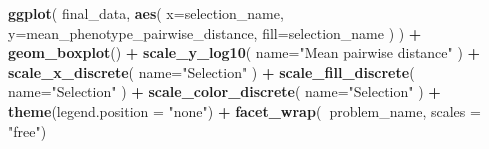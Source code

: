 \documentclass[]{book}
\newenvironment{Shaded}{\begin{snugshade}}{\end{snugshade}}
\newcommand{\CommentTok}[1]{\textcolor[rgb]{0.56,0.35,0.01}{\textit{#1}}}
\newcommand{\DataTypeTok}[1]{\textcolor[rgb]{0.13,0.29,0.53}{#1}}
\newcommand{\DecValTok}[1]{\textcolor[rgb]{0.00,0.00,0.81}{#1}}
\newcommand{\KeywordTok}[1]{\textcolor[rgb]{0.13,0.29,0.53}{\textbf{#1}}}
\newcommand{\NormalTok}[1]{#1}
\newcommand{\OperatorTok}[1]{\textcolor[rgb]{0.81,0.36,0.00}{\textbf{#1}}}
\newcommand{\StringTok}[1]{\textcolor[rgb]{0.31,0.60,0.02}{#1}}
\begin{document}
\begin{Shaded}
\end{Shaded}

\begin{Shaded}
\begin{Highlighting}[]
\KeywordTok{ggplot}\NormalTok{(}
\NormalTok{    final_data,}
    \KeywordTok{aes}\NormalTok{(}
      \DataTypeTok{x=}\NormalTok{selection_name,}
      \DataTypeTok{y=}\NormalTok{mean_phenotype_pairwise_distance,}
      \DataTypeTok{fill=}\NormalTok{selection_name}
\NormalTok{    )}
\NormalTok{  ) }\OperatorTok{+}
\StringTok{  }\KeywordTok{geom_boxplot}\NormalTok{() }\OperatorTok{+}
\StringTok{  }\KeywordTok{scale_y_log10}\NormalTok{(}
    \DataTypeTok{name=}\StringTok{"Mean pairwise distance"}
\NormalTok{  ) }\OperatorTok{+}
\StringTok{  }\KeywordTok{scale_x_discrete}\NormalTok{(}
    \DataTypeTok{name=}\StringTok{"Selection"}
\NormalTok{  ) }\OperatorTok{+}
\StringTok{  }\KeywordTok{scale_fill_discrete}\NormalTok{(}
    \DataTypeTok{name=}\StringTok{"Selection"}
\NormalTok{  ) }\OperatorTok{+}
\StringTok{  }\KeywordTok{scale_color_discrete}\NormalTok{(}
    \DataTypeTok{name=}\StringTok{"Selection"}
\NormalTok{  ) }\OperatorTok{+}\StringTok{ }
\StringTok{  }\KeywordTok{theme}\NormalTok{(}\DataTypeTok{legend.position =} \StringTok{"none"}\NormalTok{) }\OperatorTok{+}
\StringTok{    }\KeywordTok{facet_wrap}\NormalTok{(}\OperatorTok{~}\NormalTok{problem_name, }\DataTypeTok{scales =} \StringTok{"free"}\NormalTok{)}
\end{Highlighting}
\end{Shaded}
\end{document}

